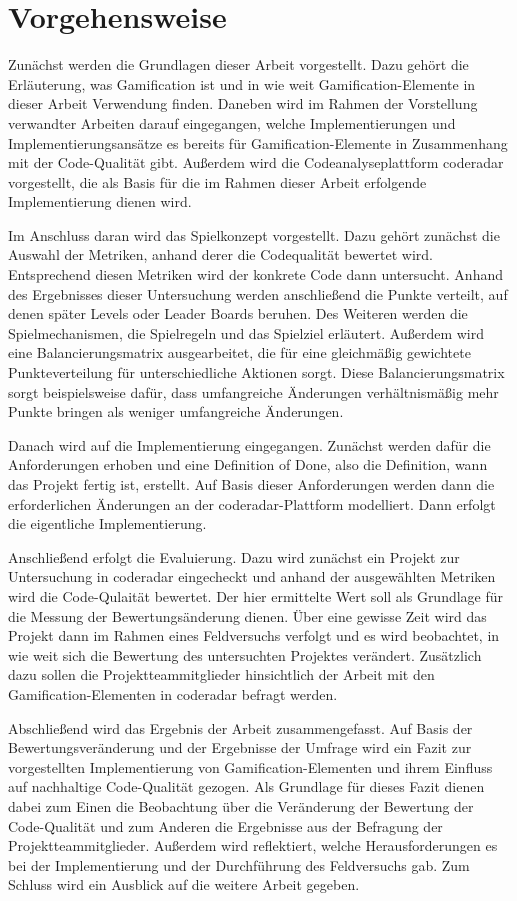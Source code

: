 \documentclass[fontsize=11pt, paper=a4, parskip=half]{scrartcl}
\begin{document}
\section{Vorgehensweise}
Zunächst werden die Grundlagen dieser Arbeit vorgestellt.
Dazu gehört die Erläuterung, was Gamification ist und in wie weit Gamification-Elemente in dieser Arbeit Verwendung finden.
Daneben wird im Rahmen der Vorstellung verwandter Arbeiten darauf eingegangen, welche Implementierungen und Implementierungsansätze es bereits für Gamification-Elemente in Zusammenhang mit der Code-Qualität gibt.
Außerdem wird die Codeanalyseplattform coderadar vorgestellt, die als Basis für die im Rahmen dieser Arbeit erfolgende Implementierung dienen wird.

Im Anschluss daran wird das Spielkonzept vorgestellt.
Dazu gehört zunächst die Auswahl der Metriken, anhand derer die Codequalität bewertet wird.
Entsprechend diesen Metriken wird der konkrete Code dann untersucht.
Anhand des Ergebnisses dieser Untersuchung werden anschließend die Punkte verteilt, auf denen später Levels oder Leader Boards beruhen.
Des Weiteren werden die Spielmechanismen, die Spielregeln und das Spielziel erläutert.
Außerdem wird eine Balancierungsmatrix ausgearbeitet, die für eine gleichmäßig gewichtete Punkteverteilung für unterschiedliche Aktionen sorgt.
Diese Balancierungsmatrix sorgt beispielsweise dafür, dass umfangreiche Änderungen verhältnismäßig mehr Punkte bringen als weniger umfangreiche Änderungen.

Danach wird auf die Implementierung eingegangen.
Zunächst werden dafür die Anforderungen erhoben und eine Definition of Done, also die Definition, wann das Projekt fertig ist, erstellt.
Auf Basis dieser Anforderungen werden dann die erforderlichen Änderungen an der coderadar-Plattform modelliert.
Dann erfolgt die eigentliche Implementierung.

Anschließend erfolgt die Evaluierung.
Dazu wird zunächst ein Projekt zur Untersuchung in coderadar eingecheckt und anhand der ausgewählten Metriken wird die Code-Qulaität bewertet.
Der hier ermittelte Wert soll als Grundlage für die Messung der Bewertungsänderung dienen.
Über eine gewisse Zeit wird das Projekt dann im Rahmen eines Feldversuchs verfolgt und es wird beobachtet, in wie weit sich die Bewertung des untersuchten Projektes verändert.
Zusätzlich dazu sollen die Projektteammitglieder hinsichtlich der Arbeit mit den Gamification-Elementen in coderadar befragt werden.

Abschließend wird das Ergebnis der Arbeit zusammengefasst.
Auf Basis der Bewertungsveränderung und der Ergebnisse der Umfrage wird ein Fazit zur vorgestellten Implementierung von Gamification-Elementen und ihrem Einfluss auf nachhaltige Code-Qualität gezogen.
Als Grundlage für dieses Fazit dienen dabei zum Einen die Beobachtung über die Veränderung der Bewertung der Code-Qualität und zum Anderen die Ergebnisse aus der Befragung der Projektteammitglieder.
Außerdem wird reflektiert, welche Herausforderungen es bei der Implementierung und der Durchführung des Feldversuchs gab.
Zum Schluss wird ein Ausblick auf die weitere Arbeit gegeben.

\pagebreak



\end{document}
